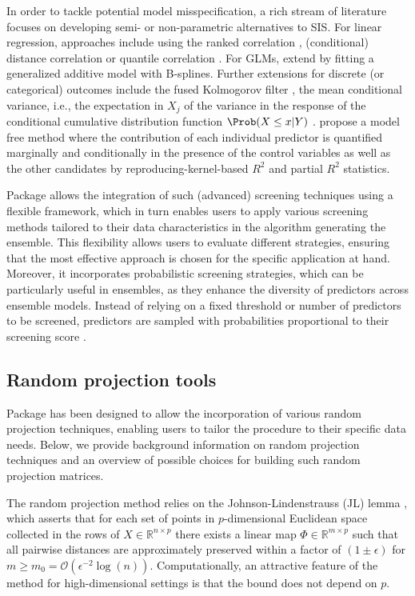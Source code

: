 \documentclass[
  article,
  nojss]{jss}
\begin{document}
In order to tackle potential model misspecification, a rich stream of
literature focuses on developing semi- or non-parametric alternatives to
SIS. For linear regression, approaches include using the ranked
correlation \citep{zhu2011model}, (conditional) distance correlation
\citep{li2012feature, wang2015conditional} or quantile correlation
\citep{ma2016robust}. For GLMs, \citet{fan2011nonparametric} extend
\citet{Fan2010sisglms} by fitting a generalized additive model with
B-splines. Further extensions for discrete (or categorical) outcomes
include the fused Kolmogorov filter \citep{mai2013kolmogorov}, the mean
conditional variance, i.e., the expectation in \(X_j\) of the variance
in the response of the conditional cumulative distribution function
\(\Prob(X\leq x|Y)\) \citep{cui2015model}. \citet{ke2023sufficient}
propose a model free method where the contribution of each individual
predictor is quantified marginally and conditionally in the presence of
the control variables as well as the other candidates by
reproducing-kernel-based \(R^2\) and partial \(R^2\) statistics.

Package  allows the integration of such (advanced) screening
techniques using a flexible framework, which in turn enables users to
apply various screening methods tailored to their data characteristics
in the algorithm generating the ensemble. This flexibility allows users
to evaluate different strategies, ensuring that the most effective
approach is chosen for the specific application at hand. Moreover, it
incorporates probabilistic screening strategies, which can be
particularly useful in ensembles, as they enhance the diversity of
predictors across ensemble models. Instead of relying on a fixed
threshold or number of predictors to be screened, predictors are sampled
with probabilities proportional to their screening score
\citep[see][]{Dunson2020TargRandProj, parzer2024glms}.

\subsection{Random projection tools}\label{sec-rps}

Package  has been designed to allow the incorporation of
various random projection techniques, enabling users to tailor the
procedure to their specific data needs. Below, we provide background
information on random projection techniques and an overview of possible
choices for building such random projection matrices.

The random projection method relies on the Johnson-Lindenstrauss (JL)
lemma \citep{JohnsonLindenstrauss1984}, which asserts that for each set
of points in \(p\)-dimensional Euclidean space collected in the rows of
\(X\in \mathbb{R}^{n\times p}\) there exists a linear map
\(\Phi\in \mathbb{R}^{m \times p}\) such that all pairwise distances are
approximately preserved within a factor of \((1\pm\epsilon)\) for
\(m\geq m_0=\mathcal O(\epsilon^{-2}\log(n))\). Computationally, an
attractive feature of the method for high-dimensional settings is that
the bound does not depend on \(p\).
\end{document}

